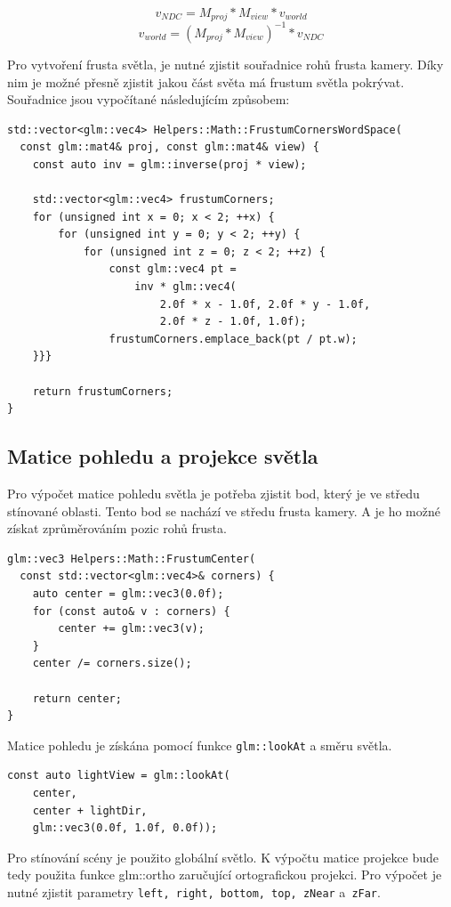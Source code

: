 \documentclass[thesis=M,czech]{FITthesis}[2019/12/23]
\begin{document}
$$
v_{NDC} = M_{proj} * M_{view} * v_{world}
$$
$$
v_{world} = (M_{proj} * M_{view})^{-1} * v_{NDC}
$$

Pro vytvoření frusta světla, je nutné zjistit souřadnice rohů frusta kamery. Díky nim je možné přesně zjistit jakou část světa má frustum světla pokrývat. Souřadnice jsou vypočítané následujícím způsobem:

\begin{verbatim}
std::vector<glm::vec4> Helpers::Math::FrustumCornersWordSpace(
  const glm::mat4& proj, const glm::mat4& view) {
    const auto inv = glm::inverse(proj * view);

    std::vector<glm::vec4> frustumCorners;
    for (unsigned int x = 0; x < 2; ++x) {
        for (unsigned int y = 0; y < 2; ++y) {
            for (unsigned int z = 0; z < 2; ++z) {
                const glm::vec4 pt =
                    inv * glm::vec4(
                        2.0f * x - 1.0f, 2.0f * y - 1.0f,
                        2.0f * z - 1.0f, 1.0f);
                frustumCorners.emplace_back(pt / pt.w);
    }}}

    return frustumCorners;
}
\end{verbatim}

\subsection{Matice pohledu a projekce světla}

Pro výpočet matice pohledu světla je potřeba zjistit bod, který je ve středu stínované oblasti. Tento bod se nachází ve středu frusta kamery. A je ho možné získat zprůměrováním pozic rohů frusta.

\begin{verbatim}
glm::vec3 Helpers::Math::FrustumCenter(
  const std::vector<glm::vec4>& corners) {
    auto center = glm::vec3(0.0f);
    for (const auto& v : corners) {
        center += glm::vec3(v);
    }
    center /= corners.size();

    return center;
}
\end{verbatim}

Matice pohledu je získána pomocí funkce \texttt{glm::lookAt} a směru světla.

\begin{verbatim}
const auto lightView = glm::lookAt(
    center,
    center + lightDir,
    glm::vec3(0.0f, 1.0f, 0.0f));
\end{verbatim}

Pro stínování scény je použito globální světlo. K výpočtu matice projekce bude tedy použita funkce glm::ortho zaručující ortografickou projekci. Pro výpočet je nutné zjistit parametry \texttt{left, right, bottom, top, zNear} a~\texttt{zFar}.
\end{document}
